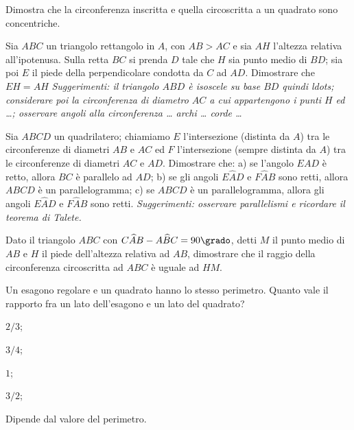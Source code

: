 \begin{esercizio}
\label{ese:5.54}
Dimostra che la circonferenza inscritta e quella circoscritta a un 
quadrato sono concentriche.
\end{esercizio}

\begin{esercizio}
\label{ese:5.55}
Sia \(ABC\) un triangolo rettangolo in \(A\), con \(AB > AC\) e sia \(AH\) 
l'altezza relativa all'ipotenusa. Sulla retta \(BC\) si prenda \(D\) tale 
che \(H\) sia punto medio di \(BD\); sia poi \(E\) il piede della 
perpendicolare condotta da \(C\) ad \(AD\). Dimostrare che \(EH = AH\)  
\emph{Suggerimenti: il triangolo \(ABD\) è isoscele su base \(BD\) quindi 
ldots{}; considerare poi la circonferenza di diametro \(AC\) a cui 
appartengono i punti \(H\) ed \ldots{}; osservare angoli alla 
circonferenza \ldots{} archi \ldots{} corde \ldots{}}
\end{esercizio}

\begin{esercizio}
\label{ese:5.56}
Sia \(ABCD\) un quadrilatero; chiamiamo \(E\) l'intersezione (distinta da 
\(A\)) tra le circonferenze di diametri \(AB\) e \(AC\) ed \(F\) 
l'intersezione (sempre distinta da \(A\)) tra le circonferenze di 
diametri \(AC\) e \(AD\). Dimostrare che: a) se l'angolo \(EAD\) è retto, 
allora \(BC\) è parallelo ad \(AD\); b) se gli angoli \(E\widehat{A}D\) e 
\(F\widehat{A}B\) sono retti, allora \(ABCD\) è un parallelogramma; c) se 
\(ABCD\) è un parallelogramma, allora gli angoli \(E\widehat{A}D\) e 
\(F\widehat{A}B\) sono retti. \emph{Suggerimenti: osservare 
parallelismi e ricordare il teorema di Talete.}
\end{esercizio}

\begin{esercizio}
\label{ese:5.57}
Dato il triangolo \(ABC\) con \(C\widehat{A}B-A\widehat{B}C=90\grado\), 
detti \(M\) il punto medio di \(AB\) e \(H\) il piede dell'altezza relativa 
ad \(AB\), dimostrare che il raggio della circonferenza circoscritta ad 
\(ABC\) è uguale ad \(HM\).
\end{esercizio}

\begin{esercizio}
\label{ese:5.58}
Un esagono regolare e un quadrato hanno lo stesso perimetro. Quanto 
vale il rapporto fra un lato dell'esagono e un lato del quadrato?
\begin{multicols}{2}
\begin{enumeratea}
\item \(2/3\);
\item \(3/4\);
\item \(1\);
\item \(3/2\);
\item Dipende dal valore del perimetro.
\end{enumeratea}
\end{multicols}
\end{esercizio}

